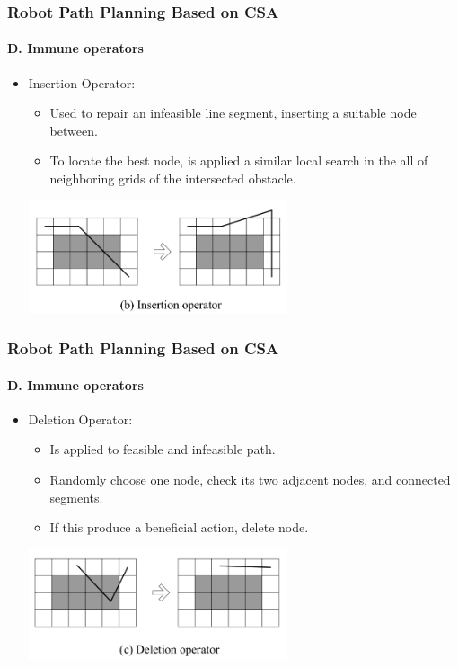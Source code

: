 \frame
{
\frametitle{Robot Path Planning Based on CSA}
\framesubtitle{D. Immune operators}
\begin{itemize}
	\item Insertion Operator:
	\begin{itemize}
		\item Used to repair an infeasible line segment, inserting a suitable node between.
		\item To locate the best node, is applied a similar local search in the all of neighboring grids of the intersected obstacle.
	\end{itemize}
	\begin{center}
		\includegraphics[width=0.6\textwidth]{img/insertion}
	\end{center}
\end{itemize}
}

\frame
{
\frametitle{Robot Path Planning Based on CSA}
\framesubtitle{D. Immune operators}
\begin{itemize}
	\item Deletion Operator:
	\begin{itemize}
		\item Is applied to feasible and infeasible path.
		\item Randomly choose one node, check its two adjacent nodes, and connected segments.
		\item If this produce a beneficial action, delete node.
	\end{itemize}
	\begin{center}
		\includegraphics[width=0.6\textwidth]{img/deletion}
	\end{center}
\end{itemize}
}

